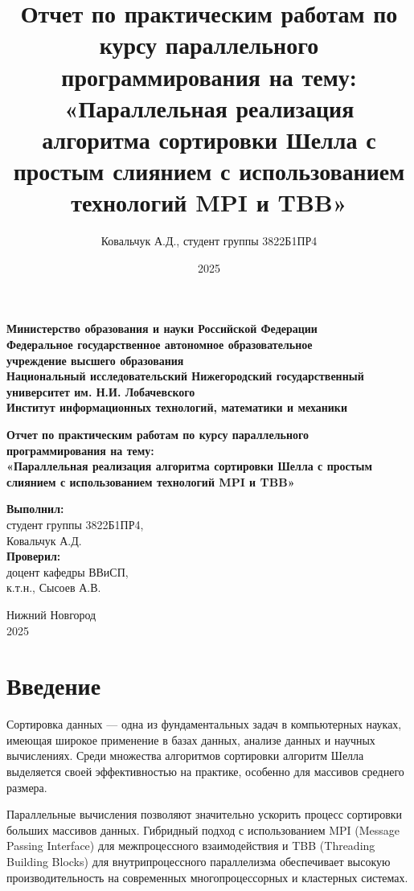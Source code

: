 \documentclass[a4paper,12pt]{article}
\title{Отчет по практическим работам по курсу параллельного программирования на тему:\\[20pt]
«Параллельная реализация алгоритма сортировки Шелла с простым слиянием с использованием технологий MPI и TBB»}
\author{Ковальчук А.Д., студент группы 3822Б1ПР4}
\date{2025}
\begin{document}
\sloppy

\begin{titlepage}
    \centering
    \textbf{Министерство образования и науки Российской Федерации\\[5pt]
    Федеральное государственное автономное образовательное\\
    учреждение высшего образования\\
    Национальный исследовательский Нижегородский государственный университет им. Н.И. Лобачевского\\[10pt]
    Институт информационных технологий, математики и механики}\\[30pt]

    \vfill

    \textbf{\Large Отчет по практическим работам по курсу параллельного программирования на тему:\\[20pt]
    «Параллельная реализация алгоритма сортировки Шелла с простым слиянием с использованием технологий MPI и TBB»}\\[70pt]

    \hfill\parbox{0.35\textwidth}{
        \textbf{Выполнил:}\\
        студент группы 3822Б1ПР4,\\
        Ковальчук А.Д.\\[10pt]
        \textbf{Проверил:}\\
        доцент кафедры ВВиСП,\\
        к.т.н., Сысоев А.В.\\
    }

    \vfill

    Нижний Новгород\\
    2025
\end{titlepage}

\clearpage
\tableofcontents
\clearpage

\section*{Введение}
Сортировка данных — одна из фундаментальных задач в компьютерных науках, имеющая широкое применение в базах данных, анализе данных и научных вычислениях. Среди множества алгоритмов сортировки алгоритм Шелла выделяется своей эффективностью на практике, особенно для массивов среднего размера. 

Параллельные вычисления позволяют значительно ускорить процесс сортировки больших массивов данных. Гибридный подход с использованием MPI (Message Passing Interface) для межпроцессного взаимодействия и TBB (Threading Building Blocks) для внутрипроцессного параллелизма обеспечивает высокую производительность на современных многопроцессорных и кластерных системах.
\end{document}

